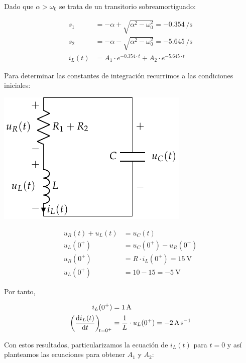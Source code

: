 \documentclass[12pt]{article}
\begin{document}
\bigskip

Dado que $\alpha > \omega_0$ se trata de un transitorio
sobreamortiguado:

\begin{align*}
  s_1 &= -\alpha + \sqrt{\alpha^2 - \omega_0^2} = \SI{-0.354}{\per\second}\\
  s_2 &= -\alpha - \sqrt{\alpha^2 - \omega_0^2} = \SI{-5.645}{\per\second}\\
  i_L(t) &= A_1 \cdot e^{-0.354 \cdot t} + A_2 \cdot e^{-5.645 \cdot t}
\end{align*}

Para determinar las constantes de integración recurrimos a las
condiciones iniciales:

\bigskip

\begin{minipage}{0.3\textwidth}
  \includegraphics[scale=0.8]{figs/FM_4_8_natural}
\end{minipage}
\begin{minipage}{0.7\textwidth}
  \begin{align*}
    u_R(t) + u_L(t) &= u_C(t)\\
    u_L(0^+) &= u_C(0^+) - u_R(0^+)\\
    u_R(0^+) &= R \cdot i_L(0^+) = \SI{15}{\volt}\\
    u_L(0^+) &= 10 - 15 = \SI{-5}{\volt}
  \end{align*}
\end{minipage}

\bigskip

Por tanto,

\begin{align*}
  i_L(0^+) &= \SI{1}{\ampere}\\
  \diff{i_L(t)}{t}[t = 0^+] &= \frac{1}{L} \cdot u_L(0^+) = \SI{-2}{\ampere\per\second}
\end{align*}

Con estos resultados, particularizamos la ecuación de $i_L(t)$ para
$t = 0$ y así planteamos las ecuaciones para obtener $A_1$ y $A_2$:
\end{document}
